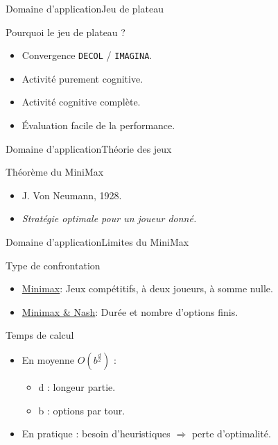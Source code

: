 \begin{frame}{Domaine d'application}{Jeu de plateau}

\begin{block}{Pourquoi le jeu de plateau ?}
\begin{itemize}
\item Convergence \texttt{DECOL} / \texttt{IMAGINA}.
\pause
\item Activité purement cognitive.
\pause
\item Activité cognitive complète.
\pause
\item Évaluation facile de la performance.
\end{itemize}
\end{block}

\end{frame}


\begin{frame}{Domaine d'application}{Théorie des jeux}

\begin{block}{Théorème du MiniMax}
\begin{itemize}
\item J. Von Neumann, 1928.
\item \textit{Stratégie optimale pour un joueur donné.}
\end{itemize}
\end{block}
\end{frame}



\begin{frame}{Domaine d'application}{Limites du MiniMax}

\begin{block}{Type de confrontation}
\begin{itemize}
\item \underline{Minimax}: Jeux compétitifs, à deux joueurs, à somme nulle.
\item \underline{Minimax \& Nash}: Durée et nombre d'options finis.
\end{itemize}
\end{block}

\pause

\begin{block}{Temps de calcul}
\begin{itemize}
\item En moyenne \emph{$O(b^{\frac{d}{2}})$} :
	\begin{itemize}
	\item d : longeur partie.
	\item b : options par tour.
	\end{itemize}
\item En pratique : besoin d'heuristiques $\Rightarrow$ perte d'optimalité.
\end{itemize}
\end{block}

\end{frame}